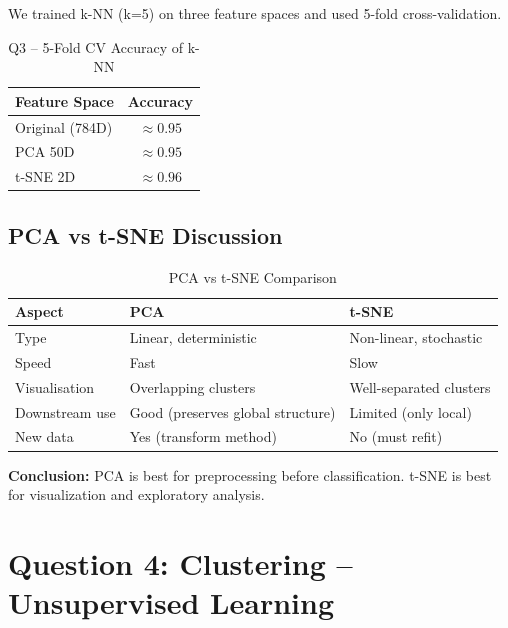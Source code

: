 \documentclass[11pt,a4paper]{article}
\begin{document}
We trained k-NN (k=5) on three feature spaces and used 5-fold cross-validation.

\begin{table}[H]
\centering
\caption{Q3 -- 5-Fold CV Accuracy of k-NN}
\label{tab:q3_knn}
\begin{tabular}{lc}
\toprule
\textbf{Feature Space} & \textbf{Accuracy} \\
\midrule
Original (784D)        & $\approx 0.95$ \\
PCA 50D                & $\approx 0.95$ \\
t-SNE 2D               & $\approx 0.96$ \\
\bottomrule
\end{tabular}
\end{table}

\subsection{PCA vs t-SNE Discussion}

\begin{table}[H]
\centering
\caption{PCA vs t-SNE Comparison}
\begin{tabular}{p{3.5cm}p{5.5cm}p{5.5cm}}
\toprule
\textbf{Aspect} & \textbf{PCA} & \textbf{t-SNE} \\
\midrule
Type           & Linear, deterministic       & Non-linear, stochastic \\
Speed          & Fast                        & Slow \\
Visualisation  & Overlapping clusters        & Well-separated clusters \\
Downstream use & Good (preserves global structure) & Limited (only local) \\
New data       & Yes (transform method)      & No (must refit) \\
\bottomrule
\end{tabular}
\end{table}

\textbf{Conclusion:} PCA is best for preprocessing before classification. t-SNE is best for visualization and exploratory analysis.

\newpage

\section{Question 4: Clustering -- Unsupervised Learning}
\end{document}
